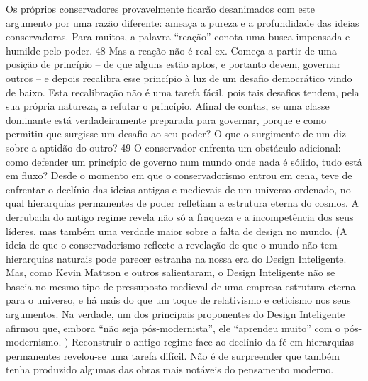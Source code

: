 Os próprios conservadores provavelmente ficarão desanimados com este argumento por uma razão diferente: ameaça a pureza e a profundidade das ideias conservadoras. Para muitos, a palavra “reação” conota uma busca impensada e humilde pelo poder. {\color{blue}48} Mas a reação não é real ex. Começa a partir de uma posição de princípio – de que alguns estão aptos, e portanto devem, governar outros – e depois recalibra esse princípio à luz de um desafio democrático vindo de baixo. Esta recalibração não é uma tarefa fácil, pois tais desafios tendem, pela sua própria natureza, a refutar o princípio. Afinal de contas, se uma classe dominante está verdadeiramente preparada para governar, porque e como permitiu que surgisse um desafio ao seu poder? O que o surgimento de um diz sobre a aptidão do outro? {\color{blue}49} O conservador enfrenta um obstáculo adicional: como defender um princípio de governo num mundo onde nada é sólido, tudo está em fluxo? Desde o momento em que o conservadorismo entrou em cena, teve de enfrentar o declínio das ideias antigas e medievais de um universo ordenado, no qual hierarquias permanentes de poder refletiam a estrutura eterna do cosmos. A derrubada do antigo regime revela não só a fraqueza e a incompetência dos seus líderes, mas também uma verdade maior sobre a falta de design no mundo. (A ideia de que o conservadorismo reflecte a revelação de que o mundo não tem hierarquias naturais pode parecer estranha na nossa era do Design Inteligente. Mas, como Kevin Mattson e outros salientaram, o Design Inteligente não se baseia no mesmo tipo de pressuposto medieval de uma empresa estrutura eterna para o universo, e há mais do que um toque de relativismo e ceticismo nos seus argumentos. Na verdade, um dos principais proponentes do Design Inteligente afirmou que, embora “não seja pós-modernista”, ele “aprendeu muito” com o pós-modernismo. ) Reconstruir o antigo regime face ao declínio da fé em hierarquias permanentes revelou-se uma tarefa difícil. Não é de surpreender que também tenha produzido algumas das obras mais notáveis ​​do pensamento moderno.
 \par 
